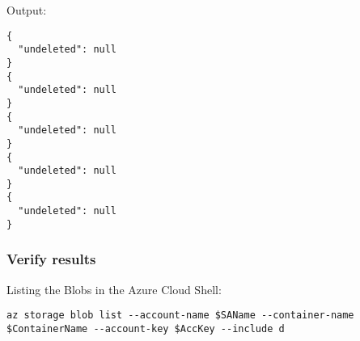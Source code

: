 Output:
\begin{verbatim}
{
  "undeleted": null
}
{
  "undeleted": null
}
{
  "undeleted": null
}
{
  "undeleted": null
}
{
  "undeleted": null
}
\end{verbatim}

\subsubsection{Verify results}
\label{sec:org0597206}
Listing the Blobs in the Azure Cloud Shell:

\begin{verbatim}
az storage blob list --account-name $SAName --container-name $ContainerName --account-key $AccKey --include d
\end{verbatim}

